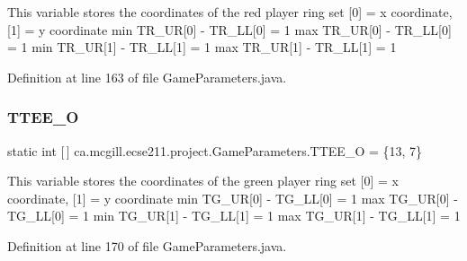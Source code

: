This variable stores the coordinates of the red player ring set \mbox{[}0\mbox{]} = x coordinate, \mbox{[}1\mbox{]} = y coordinate min T\+R\+\_\+\+UR\mbox{[}0\mbox{]} -\/ T\+R\+\_\+\+LL\mbox{[}0\mbox{]} = 1 max T\+R\+\_\+\+UR\mbox{[}0\mbox{]} -\/ T\+R\+\_\+\+LL\mbox{[}0\mbox{]} = 1 min T\+R\+\_\+\+UR\mbox{[}1\mbox{]} -\/ T\+R\+\_\+\+LL\mbox{[}1\mbox{]} = 1 max T\+R\+\_\+\+UR\mbox{[}1\mbox{]} -\/ T\+R\+\_\+\+LL\mbox{[}1\mbox{]} = 1 

Definition at line 163 of file Game\+Parameters.\+java.

\mbox{\label{enumca_1_1mcgill_1_1ecse211_1_1project_1_1_game_parameters_a50543aed3d1731225cee6fe50ebcefe0}} 
\subsubsection{\texorpdfstring{T\+T\+E\+E\+\_\+O}{TTEE\_O}}
{\footnotesize\ttfamily  static  int \mbox{[}$\,$\mbox{]} ca.\+mcgill.\+ecse211.\+project.\+Game\+Parameters.\+T\+T\+E\+E\+\_\+O = \{13, 7\}\hspace{0.3cm}{\ttfamily [static]}}

This variable stores the coordinates of the green player ring set \mbox{[}0\mbox{]} = x coordinate, \mbox{[}1\mbox{]} = y coordinate min T\+G\+\_\+\+UR\mbox{[}0\mbox{]} -\/ T\+G\+\_\+\+LL\mbox{[}0\mbox{]} = 1 max T\+G\+\_\+\+UR\mbox{[}0\mbox{]} -\/ T\+G\+\_\+\+LL\mbox{[}0\mbox{]} = 1 min T\+G\+\_\+\+UR\mbox{[}1\mbox{]} -\/ T\+G\+\_\+\+LL\mbox{[}1\mbox{]} = 1 max T\+G\+\_\+\+UR\mbox{[}1\mbox{]} -\/ T\+G\+\_\+\+LL\mbox{[}1\mbox{]} = 1 

Definition at line 170 of file Game\+Parameters.\+java.

\mbox{\label{enumca_1_1mcgill_1_1ecse211_1_1project_1_1_game_parameters_a4b437dfb1ca3a0898631dfd670828202}} 
